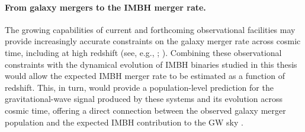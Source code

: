 \documentclass[12pt,twoside,openany]{book}
\begin{document}
\paragraph{From galaxy mergers to the IMBH merger rate.}
The growing capabilities of current and forthcoming observational facilities may provide increasingly accurate constraints on the galaxy merger rate across cosmic time, including at high redshift (see, e.g., \citealt{Duncan_2019}; \citealt{Pacucci_2023}). Combining these observational constraints with the dynamical evolution of IMBH binaries studied in this thesis would allow the expected IMBH merger rate to be estimated as a function of redshift. This, in turn, would provide a population-level prediction for the gravitational-wave signal produced by these systems and its evolution across cosmic time, offering a direct connection between the observed galaxy merger population and the expected IMBH contribution to the GW sky \parencite{Volonter_2020}.











\printbibliography
\end{document}
